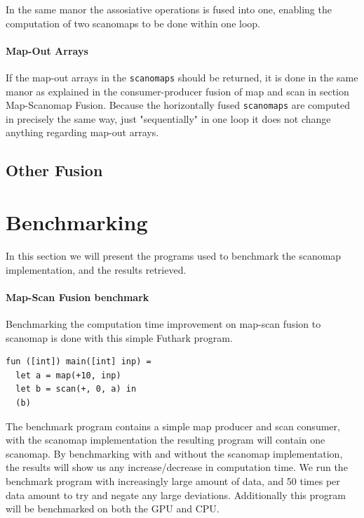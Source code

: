 \documentclass[11pt]{article}
\begin{document}
In the same manor the assosiative operations is fused into one, enabling the computation of two scanomaps to be done within one loop. 

\paragraph{Map-Out Arrays}
If the map-out arrays in the \texttt{scanomaps} should be returned, it is done in the same manor as explained in the consumer-producer fusion of map and scan in section Map-Scanomap Fusion. Because the horizontally fused \texttt{scanomaps} are computed in precisely the same way, just "sequentially" in one loop it does not change anything regarding map-out arrays.

\subsection{Other Fusion}




\newpage
\section{Benchmarking}

In this section we will present the programs used to benchmark the scanomap implementation, and the results retrieved.

\paragraph*{Map-Scan Fusion benchmark}
Benchmarking the computation time improvement on map-scan fusion to scanomap is done with this simple Futhark program. 

\begin{lstlisting}[caption=SimpleScanomap] 
fun ([int]) main([int] inp) =
  let a = map(+10, inp)
  let b = scan(+, 0, a) in
  (b)
\end{lstlisting}

The benchmark program contains a simple map producer and scan consumer, with the scanomap implementation the resulting program will contain one scanomap. By benchmarking with and without the scanomap implementation, the results will show us any increase/decrease in computation time. We run the benchmark program with increasingly large amount of data, and 50 times per data amount to try and negate any large deviations. Additionally this program will be benchmarked on both the GPU and CPU. \\
\end{document}
